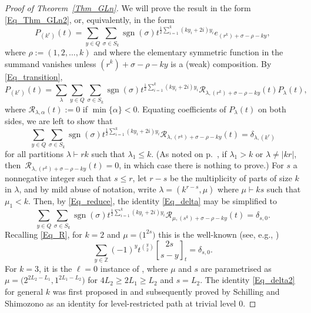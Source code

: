 \documentclass[pdftex]{sigma}
\numberwithin{equation}{section}
\renewcommand{\leq}{\leqslant}
\renewcommand{\geq}{\geqslant}
\DeclareMathOperator{\sgn}{sgn}
\newcommand{\qbin}[2]{\genfrac{[}{]}{0pt}{}{#1}{#2}}
\newcommand{\abs}[1]{\vert#1\vert}
\newcommand{\la}{\lambda}
\begin{document}
\begin{proof}[Proof of Theorem~\ref{Thm_GLn}]
We will prove the result in the form \eqref{Eq_Thm_GLn2}, or, equivalently,
in the form
\[
P_{(k^r)}(t)=\sum_{y\in Q} \sum_{\sigma\in S_k} \sgn(\sigma)
t^{\frac{1}{2}\sum_{i=1}^k (ky_i+2i)y_i} e_{(r^k)+\sigma-\rho-ky},
\]
where $\rho:=(1,2,\dots,k)$ and where the elementary symmetric
function in the summand vanishes unless
$(r^k)+\sigma-\rho-ky$ is a (weak) composition.
By \eqref{Eq_transition},
\[
P_{(k^r)}(t)=\sum_{\la}\sum_{y\in Q}\sum_{\sigma\in S_k}
\sgn(\sigma) t^{\frac{1}{2}\sum_{i=1}^k (ky_i+2i)y_i}
\mathcal{R}_{\la,(r^k)+\sigma-\rho-ky}(t) P_{\la}(t),
\]
where $\mathcal{R}_{\la,\alpha}(t):=0$ if $\min\{\alpha\}<0$.
Equating coefficients of $P_{\la}(t)$ on both sides, we are left
to show that
\begin{equation}\label{Eq_delta}
\sum_{y\in Q}\sum_{\sigma\in S_k}
\sgn(\sigma) t^{\frac{1}{2}\sum_{i=1}^k (ky_i+2i)y_i}
\mathcal{R}_{\la,(r^k)+\sigma-\rho-ky}(t)=\delta_{\la,(k^r)}
\end{equation}
for all partitions $\la\vdash rk$ such that $\la_1\leq k$.
(As noted on p.~\pageref{page_R}, if $\la_1>k$ or $\la\neq\abs{kr}$,
then~${\mathcal{R}_{\la,(r^k)+\sigma-\rho-ky}(t)=0}$, in which case
there is nothing to prove.)
For $s$ a nonnegative integer such that $s\leq r$, let $r-s$ be the
multiplicity of parts of size $k$ in $\la$, and by mild abuse of
notation, write $\la=(k^{r-s},\mu)$ where $\mu\vdash ks$ such that
$\mu_1<k$.
Then, by \eqref{Eq_reduce}, the identity \eqref{Eq_delta} may be
simplified to
\begin{equation}\label{Eq_delta2}
\sum_{y\in Q}\sum_{\sigma\in S_k}
\sgn(\sigma) t^{\frac{1}{2}\sum_{i=1}^k (ky_i+2i)y_i}
\mathcal{R}_{\mu,(s^k)+\sigma-\rho-ky}(t)=\delta_{s,0}.
\end{equation}
Recalling \eqref{Eq_R}, for $k=2$ and $\mu=\bigl(1^{2s}\bigr)$ this is the
well-known (see, e.g., \cite[equation~(2.3)]{W99})
\begin{equation}\label{Eq_unit}
\sum_{y\in\mathbb{Z}}(-1)^y t^{\binom{y}{2}} \qbin{2s}{s-y}_t=\delta_{s,0}.
\end{equation}
For $k=3$, it is the $\ell=0$ instance of \cite[Proposition 5.1]{ASW99},
where $\mu$ and $s$ are parametrised as~$\mu=\bigl(2^{2L_2-L_1},1^{2L_1-L_2}\bigr)$
for $4L_2\geq 2L_1\geq L_2$ and $s=L_2$.
The identity \eqref{Eq_delta2} for general $k$ was first proposed in
\cite[equation~(6.5)]{W99} and subsequently proved by Schilling and
Shimozono \cite[equation~(6.6)]{SS00} as an identity for
 level-restricted path at trivial level $0$.
\end{proof}
\end{document}
